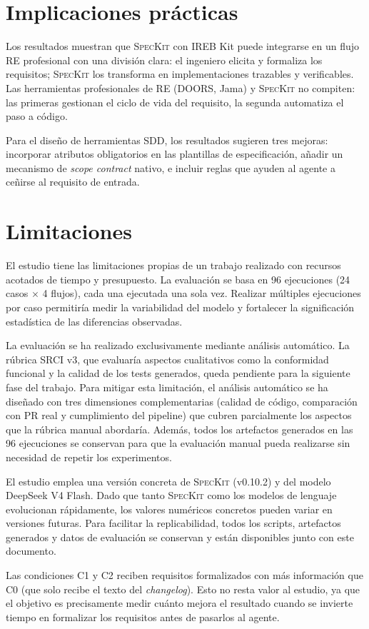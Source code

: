 \FloatBarrier
\section{Implicaciones pr\'acticas}

Los resultados muestran que \textsc{SpecKit} con IREB Kit puede integrarse en un flujo RE profesional con una divisi\'on clara: el ingeniero elicita y formaliza los requisitos; \textsc{SpecKit} los transforma en implementaciones trazables y verificables. Las herramientas profesionales de RE (DOORS, Jama) y \textsc{SpecKit} no compiten: las primeras gestionan el ciclo de vida del requisito, la segunda automatiza el paso a c\'odigo.

Para el dise\~no de herramientas SDD, los resultados sugieren tres mejoras: incorporar atributos obligatorios en las plantillas de especificaci\'on, a\~nadir un mecanismo de \emph{scope contract} nativo, e incluir reglas que ayuden al agente a ce\~nirse al requisito de entrada.

\section{Limitaciones}

El estudio tiene las limitaciones propias de un trabajo realizado con recursos acotados de tiempo y presupuesto. La evaluaci\'on se basa en 96 ejecuciones (24 casos $\times$ 4 flujos), cada una ejecutada una sola vez. Realizar m\'ultiples ejecuciones por caso permitir\'ia medir la variabilidad del modelo y fortalecer la significaci\'on estad\'istica de las diferencias observadas.

La evaluaci\'on se ha realizado exclusivamente mediante an\'alisis autom\'atico. La r\'ubrica SRCI v3, que evaluar\'ia aspectos cualitativos como la conformidad funcional y la calidad de los tests generados, queda pendiente para la siguiente fase del trabajo. Para mitigar esta limitaci\'on, el an\'alisis autom\'atico se ha dise\~nado con tres dimensiones complementarias (calidad de c\'odigo, comparaci\'on con PR real y cumplimiento del pipeline) que cubren parcialmente los aspectos que la r\'ubrica manual abordar\'ia. Adem\'as, todos los artefactos generados en las 96 ejecuciones se conservan para que la evaluaci\'on manual pueda realizarse sin necesidad de repetir los experimentos.

El estudio emplea una versi\'on concreta de \textsc{SpecKit} (v0.10.2) y del modelo DeepSeek V4 Flash. Dado que tanto \textsc{SpecKit} como los modelos de lenguaje evolucionan r\'apidamente, los valores num\'ericos concretos pueden variar en versiones futuras. Para facilitar la replicabilidad, todos los scripts, artefactos generados y datos de evaluaci\'on se conservan y est\'an disponibles junto con este documento.

Las condiciones C1 y C2 reciben requisitos formalizados con m\'as informaci\'on que C0 (que solo recibe el texto del \emph{changelog}). Esto no resta valor al estudio, ya que el objetivo es precisamente medir cu\'anto mejora el resultado cuando se invierte tiempo en formalizar los requisitos antes de pasarlos al agente.
